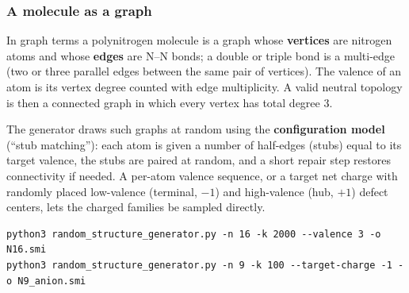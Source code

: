 \documentclass[11pt,a4paper]{article}
\begin{document}
\subsubsection{A molecule as a graph}

In graph terms a polynitrogen molecule is a graph whose \textbf{vertices} are
nitrogen atoms and whose \textbf{edges} are N--N bonds; a double or triple
bond is a multi-edge (two or three parallel edges between the same pair of
vertices). The valence of an atom is its vertex degree counted with edge
multiplicity. A valid neutral topology is then a connected graph in which
every vertex has total degree 3.

\begin{center}
\end{center}

The generator draws such graphs at random using the \textbf{configuration
model} (``stub matching''): each atom is given a number of half-edges
(stubs) equal to its target valence, the stubs are paired at random, and a
short repair step restores connectivity if needed. A per-atom valence
sequence, or a target net charge with randomly placed low-valence (terminal,
$-1$) and high-valence (hub, $+1$) defect centers, lets the charged families
be sampled directly.

\begin{lstlisting}
python3 random_structure_generator.py -n 16 -k 2000 --valence 3 -o N16.smi
python3 random_structure_generator.py -n 9 -k 100 --target-charge -1 -o N9_anion.smi
\end{lstlisting}
\end{document}

